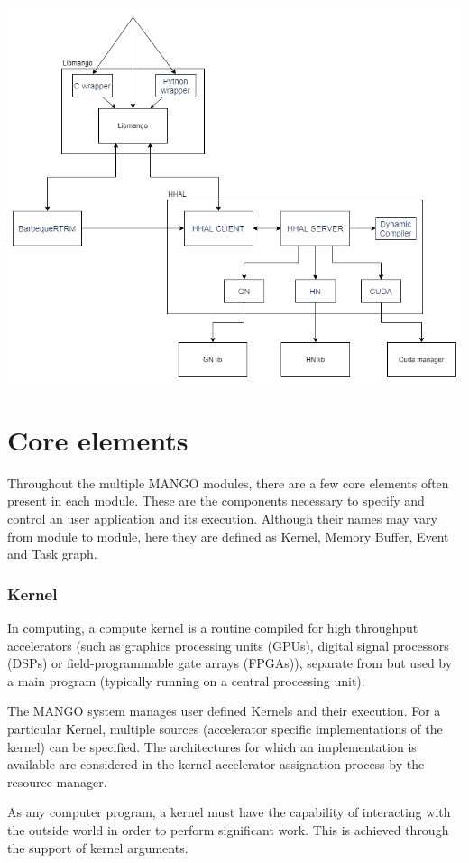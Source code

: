 \includegraphics[scale=0.5]{img/architecture.png}

\section{Core elements}
Throughout the multiple MANGO modules, there are a few core elements often present in each module. These are the components necessary to specify and control an user application and its execution. Although their names may vary from module to module, here they are defined as Kernel, Memory Buffer, Event and Task graph.

\subsubsection{Kernel}
In computing, a compute kernel is a routine compiled for high throughput accelerators (such as graphics processing units (GPUs), digital signal processors (DSPs) or field-programmable gate arrays (FPGAs)), separate from but used by a main program (typically running on a central processing unit). \cite{kernel_wikipedia}

The MANGO system manages user defined Kernels and their execution. For a particular Kernel, multiple sources (accelerator specific implementations of the kernel) can be specified. The architectures for which an implementation is available are considered in the kernel-accelerator assignation process by the resource manager. 

As any computer program, a kernel must have the capability of interacting with the outside world in order to perform significant work. This is achieved through the support of kernel arguments.

